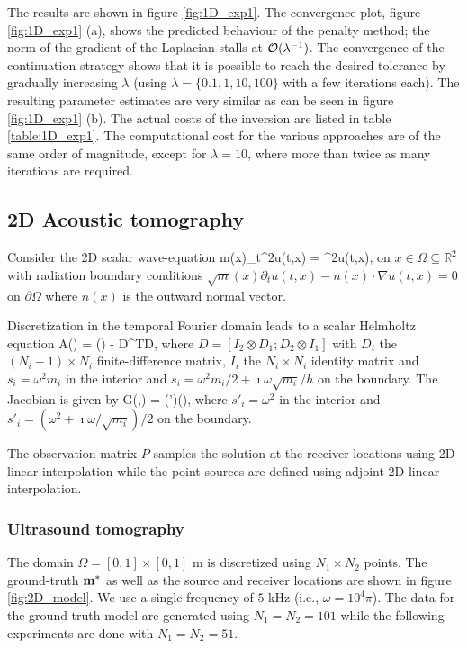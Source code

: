 \documentclass{iopart}
\begin{document}
The results are shown in figure \ref{fig:1D_exp1}. The convergence plot, figure \ref{fig:1D_exp1} (a), shows the predicted behaviour of the penalty method; the norm
of the gradient of the Laplacian stalls at $\mathcal{O}(\lambda^{-1})$. The convergence of the continuation strategy shows that it is possible to reach the desired tolerance by gradually increasing $\lambda$ (using $\lambda = \{0.1, 1, 10, 100\}$ with a few iterations each). The resulting parameter estimates are very similar as can be seen 
in figure \ref{fig:1D_exp1} (b). The actual costs of the inversion are listed in table \ref{table:1D_exp1}. The computational cost for the various approaches are of the same order of magnitude, except for $\lambda=10$, where more than twice as many iterations are required. 

\subsection{2D Acoustic tomography}
Consider the 2D scalar wave-equation
\bq
m(x)\partial_t^2u(t,x) = \nabla^2u(t,x),
\eq
on $x \in \Omega \subseteq \mathbb{R}^2$  with radiation boundary conditions $\sqrt{m}(x)\partial_tu(t,x) - n(x)\cdot\nabla u(t,x) = 0$ on $\partial\Omega$
where $n(x)$ is the outward normal vector. 

Discretization in the temporal Fourier domain leads to a scalar Helmholtz equation
\bq
A() = () - D^T\!D,
\eq
where $D = [I_2\otimes D_1; D_2\otimes I_1]$ with $D_i$ the $(N_i-1)\times N_i$ finite-difference matrix, $I_i$ the $N_i\times N_i$ identity matrix
and $s_i = \omega^2 m_i$ in the interior and $s_i = \omega^2 m_i/2 + \imath\omega\sqrt{m_i}/h$ on the boundary.
The Jacobian is given by
\bq
G(,) = (')(),
\eq
where $s'_i = \omega^2$ in the interior and $s'_i = (\omega^2 + \imath\omega/\sqrt{m_i})/2$ on the boundary.

The observation matrix $P$ samples the solution at the receiver locations using 2D linear interpolation while the point sources are defined using adjoint 2D linear interpolation.

\subsubsection{Ultrasound tomography}

The domain $\Omega = [0,1]\times [0,1]$ m is discretized using $N_1\times N_2$ points. 
The ground-truth $\mathbf{m}^*$ as well as the source and receiver locations are shown in figure  \ref{fig:2D_model}. We use a single frequency of $5$ kHz (i.e., $\omega = 10^4\pi$). The data for the ground-truth model are generated using $N_1=N_2=101$ while the following experiments are done with $N_1=N_2=51$.
\end{document}
